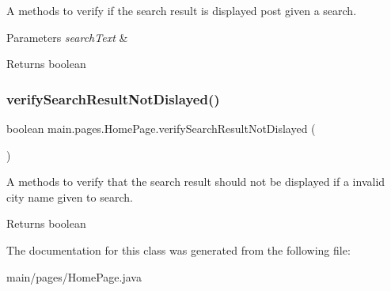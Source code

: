 A methods to verify if the search result is displayed post given a search. 
\begin{DoxyParams}{Parameters}
{\em search\+Text} & \\
\hline
\end{DoxyParams}
\begin{DoxyReturn}{Returns}
boolean 
\end{DoxyReturn}
\mbox{\label{classmain_1_1pages_1_1_home_page_a08b21c4d5923e0fc37c258ed4b854f37}} 
\subsubsection{\texorpdfstring{verify\+Search\+Result\+Not\+Dislayed()}{verifySearchResultNotDislayed()}}
{\footnotesize\ttfamily boolean main.\+pages.\+Home\+Page.\+verify\+Search\+Result\+Not\+Dislayed (\begin{DoxyParamCaption}{ }\end{DoxyParamCaption})}

A methods to verify that the search result should not be displayed if a invalid city name given to search. \begin{DoxyReturn}{Returns}
boolean 
\end{DoxyReturn}


The documentation for this class was generated from the following file\+:\begin{DoxyCompactItemize}
\item 
main/pages/Home\+Page.\+java\end{DoxyCompactItemize}
